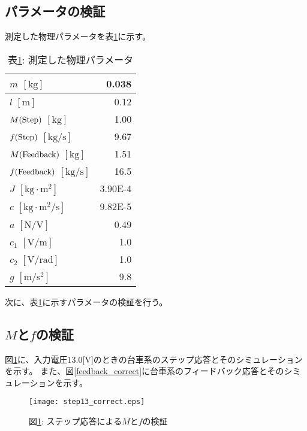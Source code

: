 \subsection{パラメータの検証}
測定した物理パラメータを表\ref{pend_params}に示す。

\begin{table}[htbp]
    \begin{center}
        \caption{表\ref{pend_params}: 測定した物理パラメータ}
        \begin{tabular}{|l|r|} \hline
            $m$ $[\mathrm{kg}]$ & 0.038 \\ \hline
            $l$ $[\mathrm{m}]$ & 0.12 \\ \hline
            $M(\rm{Step})$ $[\mathrm{kg}]$ & 1.00 \\ \hline
            $f(\rm{Step})$ $[\mathrm{kg/s}]$ & 9.67 \\ \hline
            $M(\rm{Feedback})$ $[\mathrm{kg}]$ & 1.51 \\ \hline
            $f(\rm{Feedback})$ $[\mathrm{kg/s}]$ & 16.5 \\ \hline
            $J$ $[\mathrm{kg \cdot m^2}]$ & 3.90E-4 \\ \hline
            $c$ $[\mathrm{kg \cdot m^2/s}]$ & 9.82E-5 \\ \hline
            $a$ $[\mathrm{N/V}]$ & 0.49 \\ \hline
            $c_1$ $[\mathrm{V/m}]$ & 1.0 \\ \hline
            $c_2$ $[\mathrm{V/rad}]$ & 1.0 \\ \hline
            $g$ $[\mathrm{m/s^2}]$ & 9.8 \\ \hline
        \end{tabular}
        \label{pend_params}
    \end{center}
\end{table}

次に、表\ref{pend_params}に示すパラメータの検証を行う。

\subsection{$M$と$f$の検証}
図\ref{step13_correct}に、入力電圧$13.0$[V]のときの台車系のステップ応答とそのシミュレーションを示す。
また、図\ref{feedback_correct}に台車系のフィードバック応答とそのシミュレーションを示す。

\begin{figure}[htbp]
    \begin{center}
        \texttt{[image: step13\_correct.eps]}
        \caption{図\ref{step13_correct}: ステップ応答による$M$と$f$の検証}
        \label{step13_correct}
    \end{center}
\end{figure}

